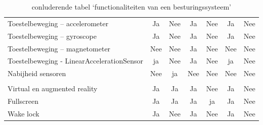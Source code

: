 \begin{table}[]
\begin{tabular}{p{6cm}cccccc}
			   Toestelbeweging – accelerometer & \cellcolor{green!40} Ja  & \cellcolor{red!50} Nee & \cellcolor{green!40} Ja  & \cellcolor{red!50} Nee& \cellcolor{green!40} Ja & \cellcolor{red!50} Nee \\
			   
			   Toestelbeweging – gyroscope & \cellcolor{green!40} Ja  & \cellcolor{red!50} Nee & \cellcolor{green!40} Ja  & \cellcolor{red!50} Nee& \cellcolor{green!40} Ja & \cellcolor{red!50} Nee \\
			   
			    Toestelbeweging – magnetometer & \cellcolor{red!50} Nee  & \cellcolor{red!50} Nee & \cellcolor{green!40} Ja  & \cellcolor{red!50} Nee& \cellcolor{red!50} Nee & \cellcolor{red!50} Nee \\
			   
			   Toestelbeweging - LinearAccelerationSensor & \cellcolor{green!40} ja  & \cellcolor{red!50} Nee & \cellcolor{green!40} Ja  & \cellcolor{red!50} Nee& \cellcolor{green!40} ja  & \cellcolor{red!50} Nee \\
			   
			   Nabijheid sensoren &  \cellcolor{red!50} Nee  &  \cellcolor{green!40} ja  &  \cellcolor{red!50} Nee  & \cellcolor{red!50} Nee &  \cellcolor{red!50} Nee &  \cellcolor{red!50} Nee \\
			   
			   &  & &  &  &  &  \\
			   
			    Virtual en augmented reality  & \cellcolor{green!40} Ja  & \cellcolor{green!40} Ja & \cellcolor{green!40} Ja & \cellcolor{red!50} Nee  & \cellcolor{green!40} Ja & \cellcolor{red!50} Nee \\
			    
			     Fullscreen & \cellcolor{green!40} Ja  & \cellcolor{green!40} Ja & \cellcolor{green!40} Ja & \cellcolor{green!40} ja   & \cellcolor{green!40} Ja & \cellcolor{red!50} Nee \\
			   
			   Wake lock & \cellcolor{green!40} Ja  &  \cellcolor{red!50} Nee & \cellcolor{green!40} Ja  & \cellcolor{red!50} Nee & \cellcolor{green!40} Ja &  \cellcolor{red!50} Nee \\
		


		\end{tabular}	
		\caption{conluderende tabel ‘functionaliteiten van een besturingssysteem’}
	\end{table}

